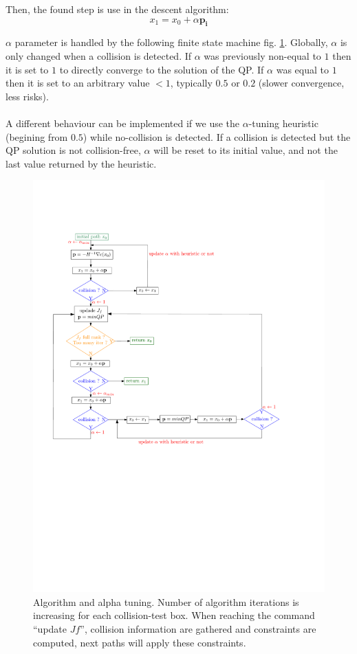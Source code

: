 \documentclass {article}
\newcommand\p{\mathbf{p_i}}
\begin{document}
\vspace{0.4cm}

Then, the found step is use in the descent algorithm:
$$ x_1 = x_0 + \alpha\p $$

$\alpha$ parameter is handled by the following finite state machine fig.
\ref{fig:finiteStateMachine}. Globally, $\alpha$ is only changed when a collision 
is detected. If $\alpha$ was previously non-equal to $1$ then it is set to $1$ 
to directly converge to the solution of the QP. If $\alpha$ was equal to $1$ 
then it is set to an arbitrary value $<1$, typically $0.5$ or $0.2$ (slower 
convergence, less risks). \\
\\
A different behaviour can be implemented if we use the $\alpha$-tuning 
heuristic (begining from $0.5$) while no-collision is detected. If a collision 
is detected but the QP solution is not collision-free, $\alpha$ will be reset 
to its initial value, and not the last value returned by the heuristic.

\begin{figure}[H]
	\centering
	\includegraphics[width=14cm]{finiteStateMachine.pdf}
	\caption{Algorithm and alpha tuning. Number of algorithm iterations is 
increasing for each collision-test box. When reaching the command 
``update $Jf$'', collision information are gathered and constraints are 
computed, next paths will apply these constraints.}
	\label{fig:finiteStateMachine}
\end{figure}
\end{document}
